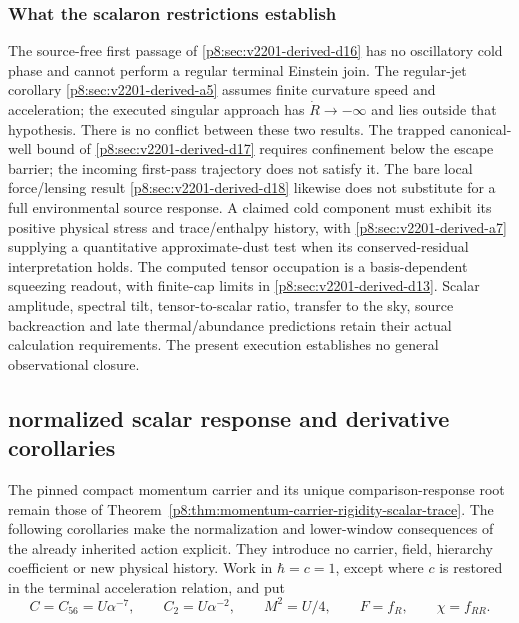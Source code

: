 \documentclass[12pt,a4paper]{article}
\begin{document}
\subsubsection{What the scalaron restrictions establish}
\label{p8:sec:v2201-scalaron-readout-status}
The source-free first passage of \ref{p8:sec:v2201-derived-d16} has no
oscillatory cold phase and cannot perform a regular terminal Einstein join.
The regular-jet corollary \ref{p8:sec:v2201-derived-a5} assumes finite
curvature speed and acceleration; the executed singular approach has
$\dot R\to-\infty$ and lies outside that hypothesis. There is no conflict
between these two results.
The trapped canonical-well bound of \ref{p8:sec:v2201-derived-d17}
requires confinement below the escape barrier; the incoming first-pass
trajectory does not satisfy it. The bare local force/lensing result
\ref{p8:sec:v2201-derived-d18} likewise does not substitute for a full
environmental source response. A claimed cold component must exhibit its
positive physical stress and trace/enthalpy history, with
\ref{p8:sec:v2201-derived-a7} supplying a quantitative approximate-dust
test when its conserved-residual interpretation holds.
The computed tensor occupation is a basis-dependent squeezing readout,
with finite-cap limits in \ref{p8:sec:v2201-derived-d13}. Scalar amplitude,
spectral tilt, tensor-to-scalar ratio, transfer to the sky, source
backreaction and late thermal/abundance predictions retain their actual
calculation requirements. The present execution establishes no general
observational closure.


\subsection{normalized scalar response and derivative corollaries}
\label{p8:sec:v2202-normalized-forced-scalar-response}
The pinned compact momentum carrier and its unique comparison-response
root remain those of
Theorem~\ref{p8:thm:momentum-carrier-rigidity-scalar-trace}.  The following
corollaries make the normalization and lower-window consequences of the
already inherited action explicit.  They introduce no carrier, field,
hierarchy coefficient or new physical history.  Work in $\hbar=c=1$,
except where $c$ is restored in the terminal acceleration relation, and put
\[
 C=C_{56}=U\alpha^{-7},\qquad C_2=U\alpha^{-2},\qquad
 M^2=U/4,\qquad F=f_R,\qquad \chi=f_{RR}.
\]
\end{document}
